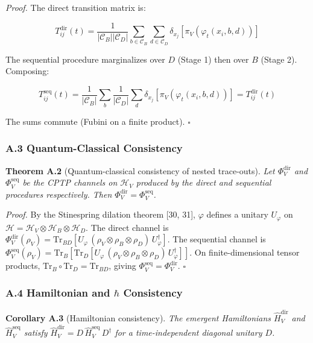 \documentclass[
]{article}
\begin{document}
\emph{Proof.} The direct transition matrix is:

\[T^{\text{dir}}_{ij}(t) = \frac{1}{|\mathcal{C}_B||\mathcal{C}_D|} \sum_{b \in \mathcal{C}_B} \sum_{d \in \mathcal{C}_D} \delta_{x_j}[\pi_V(\varphi_t(x_i, b, d))]\]

The sequential procedure marginalizes over \(D\) (Stage 1) then over
\(B\) (Stage 2). Composing:

\[T^{\text{seq}}_{ij}(t) = \frac{1}{|\mathcal{C}_B|} \sum_b \frac{1}{|\mathcal{C}_D|} \sum_d \delta_{x_j}[\pi_V(\varphi_t(x_i, b, d))] = T^{\text{dir}}_{ij}(t)\]

The sums commute (Fubini on a finite product). \(\square\)

\hypertarget{a.3-quantum-classical-consistency}{%
\subsubsection{A.3 Quantum-Classical
Consistency}\label{a.3-quantum-classical-consistency}}

\textbf{Theorem A.2} (Quantum-classical consistency of nested
trace-outs). \emph{Let \(\Phi_V^{\text{dir}}\) and
\(\Phi_V^{\text{seq}}\) be the CPTP channels on \(\mathcal{H}_V\)
produced by the direct and sequential procedures respectively. Then
\(\Phi_V^{\text{dir}} = \Phi_V^{\text{seq}}\).}

\emph{Proof.} By the Stinespring dilation theorem {[}30, 31{]},
\(\varphi\) defines a unitary \(U_\varphi\) on
\(\mathcal{H} = \mathcal{H}_V \otimes \mathcal{H}_B \otimes \mathcal{H}_D\).
The direct channel is
\(\Phi_V^{\text{dir}}(\rho_V) = \text{Tr}_{BD}[U_\varphi\,(\rho_V \otimes \rho_B \otimes \rho_D)\,U_\varphi^\dagger]\).
The sequential channel is
\(\Phi_V^{\text{seq}}(\rho_V) = \text{Tr}_B[\text{Tr}_D[U_\varphi\,(\rho_V \otimes \rho_B \otimes \rho_D)\,U_\varphi^\dagger]]\).
On finite-dimensional tensor products,
\(\text{Tr}_B \circ \text{Tr}_D = \text{Tr}_{BD}\), giving
\(\Phi_V^{\text{seq}} = \Phi_V^{\text{dir}}\). \(\square\)

\hypertarget{a.4-hamiltonian-and-hbar-consistency}{%
\subsubsection{\texorpdfstring{A.4 Hamiltonian and \(\hbar\)
Consistency}{A.4 Hamiltonian and \textbackslash hbar Consistency}}\label{a.4-hamiltonian-and-hbar-consistency}}

\textbf{Corollary A.3} (Hamiltonian consistency). \emph{The emergent
Hamiltonians \(\hat{H}_V^{\text{dir}}\) and \(\hat{H}_V^{\text{seq}}\)
satisfy
\(\hat{H}_V^{\text{dir}} = D\,\hat{H}_V^{\text{seq}}\,D^\dagger\) for a
time-independent diagonal unitary \(D\).}
\end{document}
